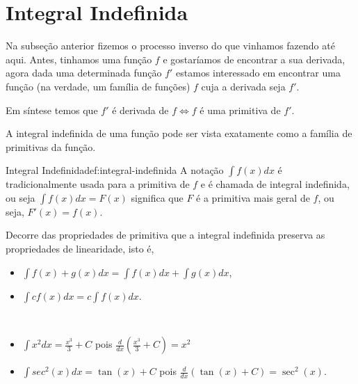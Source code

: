 \section{Integral Indefinida}

Na subseção anterior fizemos o processo inverso do que vinhamos fazendo até
aqui. Antes, tinhamos uma função $f$ e gostaríamos de encontrar a sua derivada,
agora dada uma determinada função $f'$ estamos interessado em encontrar uma
função (na verdade, um família de funções) $f$ cuja a derivada seja $f'$.

Em síntese temos que $f'$ é derivada de $f \Leftrightarrow f$ é uma primitiva
de $f'$.

A integral indefinida de uma função pode ser vista exatamente como a família de
primitivas da função.

\begin{definicao}{Integral Indefinida}{def:integral-indefinida}
  A notação $\int f(x) dx$ é tradicionalmente usada para a
  primitiva de $f$ e é chamada de integral indefinida, ou seja
  $\int f(x) dx= F(x)$ significa que $F$ é a primitiva mais geral de $f$,
  ou seja, $F'(x)=f(x)$.
\end{definicao}

Decorre das propriedades de primitiva que a integral indefinida preserva as
propriedades de linearidade, isto é,
\begin{itemize}
  \item \(\int f(x)+g(x) dx = \int f(x) dx + \int g(x) dx\),
  \item \(\int c f(x) dx = c \int f(x) dx\).
\end{itemize}

\begin{example}~
  \solution
  \begin{itemize}
    \item \(\int x^2 dx = \frac{x^3}{3}+C\)
    pois \(\frac{d}{dx} \left(  \frac{x^3}{3}+C \right)=x^2\)
    \item \(\int sec^2(x) dx = \tan(x)+C \)
    pois \(\frac{d}{dx} \left( \tan(x)+C \right)=\sec^2(x)\).
  \end{itemize}
\end{example}

